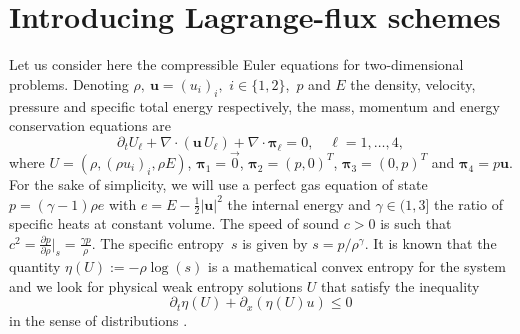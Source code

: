 \documentclass[graybox]{svmult}
\newcommand{\bu}{\bm{u}}
\newcommand{\bpi}{\bm{\pi}}
\begin{document}
\section{Introducing Lagrange-flux schemes}
%
%
Let us consider here the compressible Euler equations for two-dimensional problems. Denoting $\rho,\ \bu=(u_i)_i,$ $i\in\{1,2\}$,\ $p$ and $E$ the density,
velocity, pressure and specific total energy respectively, the mass, momentum and
energy conservation equations are
%
\begin{equation}
\partial_t U_\ell + \nabla\cdot(\bu\, U_\ell) + \nabla\cdot\bpi_\ell=0,
\quad \ell=1,\dots,4,
\end{equation}
%
where $U=(\rho,(\rho u_i)_i,\rho E)$, $\bpi_1=\vec 0$, $\bpi_2=(p,0)^T$,
$\bpi_3=(0,p)^T$ and $\bpi_4=p\bu$.
For the sake of simplicity, we will use a perfect gas equation of state
$p=(\gamma-1)\rho e$ with  $e=E-\frac{1}{2}|\bu|^2$ the internal energy
and $\gamma\in(1,3]$ the ratio of specific heats at constant volume. 
The speed of sound $c>0$ is such that $c^2=\frac{\partial p}{\partial \rho}|_s=\frac{\gamma p}{\rho}$.
The specific entropy~$s$ is given by $s=p/\rho^\gamma$. It is known that
the quantity $\eta(U):=-\rho\log(s)$ is a mathematical convex entropy for the system
and we look for physical weak entropy solutions $U$ that satisfy the inequality
\[
\partial_t\eta(U) + \partial_x(\eta(U) u) \leq 0
\]
in the sense of distributions \cite{GR96}. \medskip
\end{document}
